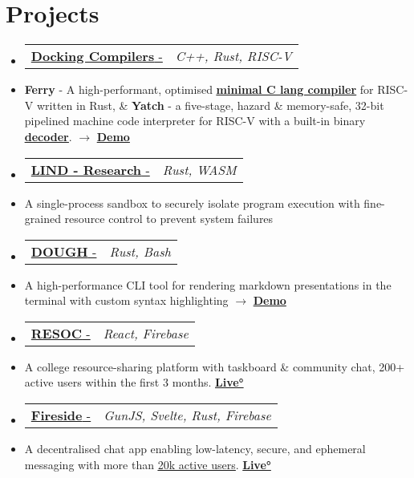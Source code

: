 \documentclass[letterpaper,10pt]{article}
\makeatletter
\newcommand{\resumeItem}[1]{
  \item\small{
    {#1 \vspace{-2pt}}
  }
}
\newcommand{\resumeProjectHeading}[2]{
    \item
    \begin{tabular*}{0.97\textwidth}{l@{\extracolsep{\fill}}r}
      \small#1 & \textit{\small #2} \\
    \end{tabular*}\vspace{-4 pt}
}
\newcommand{\resumeSubItem}[1]{\resumeItem{#1}\vspace{-4pt}}
\newcommand{\resumeSubHeadingListStart}{\begin{itemize}[leftmargin=0.15in, label={}]}
\newcommand{\resumeSubHeadingListEnd}{\end{itemize}}
\makeatother
\begin{document}
\section{Projects}
  \resumeSubHeadingListStart
  \resumeProjectHeading
  {\href{https://anubhavp.dev/blog/hacktoberfest}{\textbf{Docking Compilers} - \faIcon{link}}}{C++, Rust, RISC-V}
    \resumeSubItem
      {\textbf{Ferry} - A high-performant, optimised {\href{https://anubhavp.dev/blog/ferryman.html} {\underline{\textbf{minimal C lang compiler}}}} for RISC-V written in Rust, \& \textbf{Yatch} - a five-stage, hazard \& memory-safe, 32-bit pipelined machine code interpreter for RISC-V with a built-in binary {\href{https://anubhavp.dev/barney}{\underline{\textbf{decoder}}}}. $\rightarrow$ {\href{https://anubhavp.dev/blog/hacktoberfest.html}{\textbf{Demo}}}}
  \resumeProjectHeading
    {\href{https://github.com/Lind-Project/lind_project}{\textbf{LIND - Research} \text{/ Open Source Contribution} - \faIcon{link}}}{Rust, WASM}
    \resumeSubItem
      {A single-process sandbox to securely isolate program execution with fine-grained resource control to prevent system failures}
  \resumeProjectHeading
    {\href{https://github.com/anubhavpgit/dough}{\textbf{DOUGH} - \faIcon{link}}}{Rust, Bash}
    \resumeSubItem
      {A high-performance CLI tool for rendering markdown presentations in the terminal with custom syntax highlighting $\rightarrow$ {\href{https://anubhavp.dev/blog/dough.html}{\textbf{Demo}}}}
  \resumeProjectHeading
    {\href{https://github.com/anubhavpgit/resoc}{\textbf{RESOC} - \faIcon{link} }}{React, Firebase}
    \resumeSubItem
      {A college resource-sharing platform with taskboard \& community chat, 200+ active users within the first 3 months. {\href{https://resoc.in}{\textbf{Live°}}}}
    \resumeProjectHeading
    {\href{https://github.com/anubhavpgit/fireside/}{\textbf{Fireside} - \faIcon{link}}}{GunJS, Svelte, Rust, Firebase}
    \resumeSubItem
      {A decentralised chat app enabling low-latency, secure, and ephemeral messaging with more than \href{https://www.linkedin.com/posts/anubhabpatnaik_1000-users-in-a-week-checkout-the-main-activity-7342957210668253185-8Ot1?utm_source=share&utm_medium=member_desktop&rcm=ACoAAC4e4n4B5W43U8Ri0A4HEtOs405cdFxB448}{\underline{{20k active users}}}. {\href{https://anubhavp.dev/fireside/}{\textbf{Live°}}}}
  \resumeSubHeadingListEnd
\end{document}
